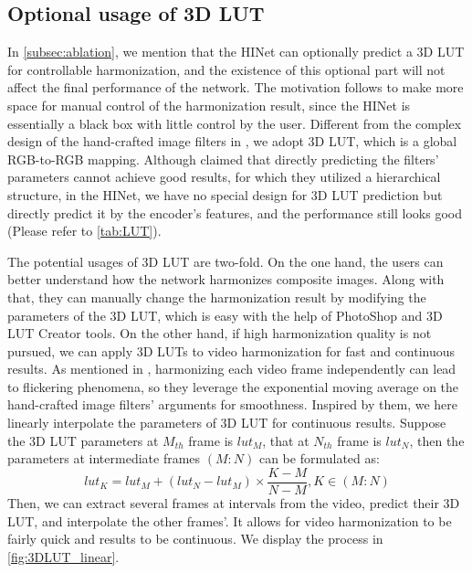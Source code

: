 \documentclass[10pt,journal,twocolumn,twoside]{IEEEtran}
\begin{document}
\subsection{Optional usage of 3D LUT}
\label{subsec: application 3d}
In \cref{subsec:ablation}, we mention that the HINet can optionally predict a 3D LUT for controllable harmonization, and the existence of this optional part will not affect the final performance of the network. The motivation follows \cite{xue2022dccf, ke2022harmonizer} to make more space for manual control of the harmonization result, since the HINet is essentially a black box with little control by the user. Different from the complex design of the hand-crafted image filters in \cite{xue2022dccf, ke2022harmonizer}, we adopt 3D LUT, which is a global RGB-to-RGB mapping. Although \cite{ke2022harmonizer} claimed that directly predicting the filters' parameters cannot achieve good results, for which they utilized a hierarchical structure, in the HINet, we have no special design for 3D LUT prediction but directly predict it by the encoder's features, and the performance still looks good (Please refer to \cref{tab:LUT}).

The potential usages of 3D LUT are two-fold. On the one hand, the users can better understand how the network harmonizes composite images. Along with that, they can manually change the harmonization result by modifying the parameters of the 3D LUT, which is easy with the help of PhotoShop and 3D LUT Creator tools. On the other hand, if high harmonization quality is not pursued, we can apply 3D LUTs to video harmonization for fast and continuous results. As mentioned in \cite{ke2022harmonizer}, harmonizing each video frame independently can lead to flickering phenomena, so they leverage the exponential moving average on the hand-crafted image filters' arguments for smoothness. Inspired by them, we here linearly interpolate the parameters of 3D LUT for continuous results. Suppose the 3D LUT parameters at $M_{th}$ frame is $lut_M$, that at $N_{th}$ frame is $lut_N$, then the parameters at intermediate frames $(M:N)$ can be formulated as:
\begin{equation}
  lut_{K} = lut_M + (lut_N - lut_M) \times \frac{K - M}{N - M}, K \in (M: N)
  \label{eq:lut_linear}
\end{equation}
Then, we can extract several frames at intervals from the video, predict their 3D LUT, and interpolate the other frames'. It allows for video harmonization to be fairly quick and results to be continuous. We display the process in \cref{fig:3DLUT_linear}.
\end{document}
